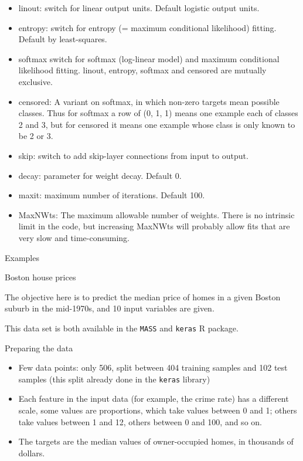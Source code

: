 \documentclass[10pt,ignorenonframetext,]{beamer}
\providecommand{\tightlist}{%
  \setlength{\itemsep}{0pt}\setlength{\parskip}{0pt}}
\begin{document}
\begin{frame}

\begin{itemize}
\tightlist
\item
  linout: switch for linear output units. Default logistic output units.
\item
  entropy: switch for entropy (= maximum conditional likelihood)
  fitting. Default by least-squares.
\item
  softmax switch for softmax (log-linear model) and maximum conditional
  likelihood fitting. linout, entropy, softmax and censored are mutually
  exclusive.
\item
  censored: A variant on softmax, in which non-zero targets mean
  possible classes. Thus for softmax a row of (0, 1, 1) means one
  example each of classes 2 and 3, but for censored it means one example
  whose class is only known to be 2 or 3.
\item
  skip: switch to add skip-layer connections from input to output.
\item
  decay: parameter for weight decay. Default 0.
\item
  maxit: maximum number of iterations. Default 100.
\item
  MaxNWts: The maximum allowable number of weights. There is no
  intrinsic limit in the code, but increasing MaxNWts will probably
  allow fits that are very slow and time-consuming.
\end{itemize}

\end{frame}

\begin{frame}[fragile]{Examples}

\begin{block}{Boston house prices}

The objective here is to predict the median price of homes in a given
Boston suburb in the mid-1970s, and 10 input variables are given.

This data set is both available in the \texttt{MASS} and \texttt{keras}
R package.

\begin{block}{Preparing the data}

\begin{itemize}
\tightlist
\item
  Few data points: only 506, split between 404 training samples and 102
  test samples (this split already done in the \texttt{keras} library)
\item
  Each feature in the input data (for example, the crime rate) has a
  different scale, some values are proportions, which take values
  between 0 and 1; others take values between 1 and 12, others between 0
  and 100, and so on.
\item
  The targets are the median values of owner-occupied homes, in
  thousands of dollars.
\end{itemize}

\end{block}

\end{block}

\end{frame}
\end{document}

